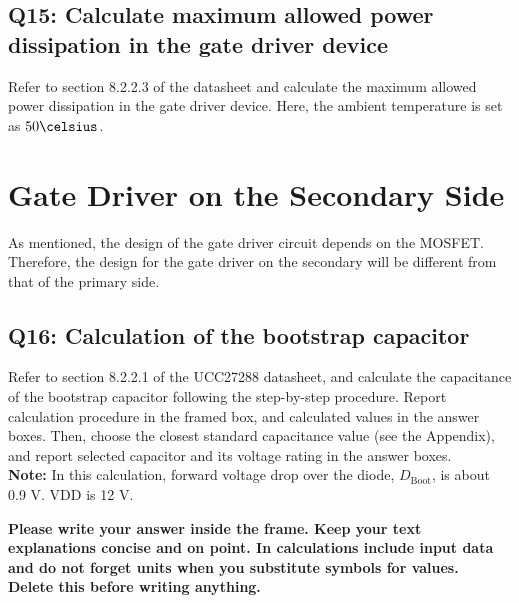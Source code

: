 \documentclass{PELsmallreport}
\begin{document}
\subsection{Q15: Calculate maximum allowed power dissipation in the gate driver device}
Refer to section 8.2.2.3 of the datasheet and calculate the maximum allowed power dissipation in the gate driver device. Here, the ambient temperature is set as $50 \celsius$. \\

 \quad \hfill{}

\newpage

\section{Gate Driver on the Secondary Side}
As mentioned, the design of the gate driver circuit depends on the MOSFET. Therefore, the design for the gate driver on the secondary will be different from that of the primary side. 

\subsection{Q16: Calculation of the bootstrap capacitor}
Refer to section 8.2.2.1 of the UCC27288 datasheet, and calculate the capacitance of the bootstrap capacitor following the step-by-step procedure. Report calculation procedure in the framed box, and calculated values in the answer boxes. Then, choose the closest standard capacitance value (see the Appendix), and report selected capacitor and its voltage rating in the answer boxes.\\
\textbf{Note:} In this calculation, forward voltage drop over the diode, $D_{\text{Boot}}$, is about 0.9 V. VDD is 12 V.
\begin{framed}
	\vspace{2em}
	\textbf{Please write your answer inside the frame. Keep your text explanations concise and on point. In calculations include input data and do not forget units when you substitute symbols for values. \\ Delete this before writing anything.}
	\vspace{2em}
\end{framed}
 \quad {} \quad {} \\
 \quad {} \hfill {}
\end{document}
